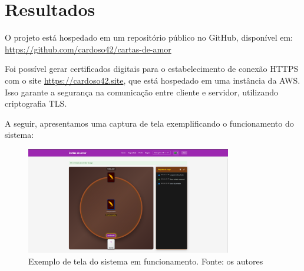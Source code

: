 \chapter{Resultados}

O projeto está hospedado em um repositório público no GitHub, disponível em: 
\url{https://github.com/cardoso42/cartas-de-amor}

Foi possível gerar certificados digitais para o estabelecimento de conexão HTTPS com o site \url{https://cardoso42.site}, que está hospedado em uma instância da AWS. Isso garante a segurança na comunicação entre cliente e servidor, utilizando criptografia TLS.

A seguir, apresentamos uma captura de tela exemplificando o funcionamento do sistema:

\begin{figure}[H]
    \centering
    \includegraphics[width=0.8\textwidth]{screens/image.png}
    \caption{Exemplo de tela do sistema em funcionamento. Fonte: os autores}
    \label{fig:screen_example}
\end{figure}


